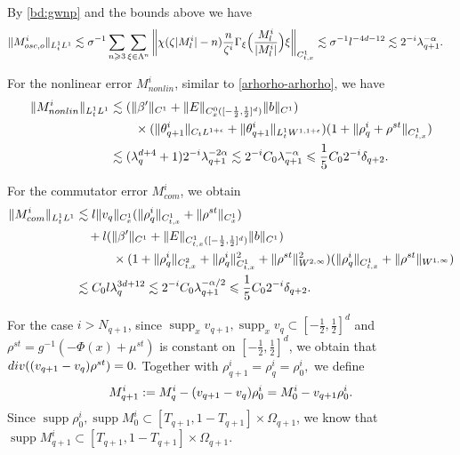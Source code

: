 \documentclass[10pt,a4paper]{amsart}
\numberwithin{equation}{section}
\DeclareMathOperator{\supp}{supp}
\def\({{\Big(}}
\def\){{\Big)}}
\newcommand{\norm}[1]{\left\|#1\right\|}
\def\geq{\geqslant}
\def\leq{\leqslant}
\def\div{\mathord{{\rm div}}}
\def\({{\Big(}}
\def\){{\Big)}}
\def\geq{\geqslant}
\def\leq{\leqslant}
\def\div{\mathord{{\rm div}}}
\begin{document}
 
 

 By \eqref{bd:gwnp} and the bounds above    we have
\begin{align}
   \|  M^{i}_{osc,o}\|_{L^1_tL^1}&\lesssim \sigma^{-1}\sum_{n\geq3}\sum_{\xi\in\Lambda^{n}}\norm{  \chi(\zeta|M_l^i|-n)\frac{n}{\zeta^i}\Gamma_{\xi}\(\frac{M^{i}_l}{|M^{i}_l|}\)\xi}_{C_{t,x}^1} \lesssim  \sigma^{-1}l^{-4d-12}
   \lesssim 2^{-i}\lambda_{q+1}^{-\alpha}.\notag
\end{align} 
 
For the nonlinear error $M_{nonlin}^i$,  similar to \eqref{arhorho-arhorho}, we have
\begin{align}
    \|M^{i}_{nonlin}\|_{L^1_tL^1} 
      &\lesssim (\|\beta' \|_{C^1 }+\|E \|_{C_{x}^0([-\frac12,\frac12]^d)}\|b\|_{C^1})\notag\\
       &\quad\quad\times ( \|\theta^{i}_{q+1}\|_{C_tL^{1+\epsilon}}+ \|\theta^{i}_{q+1}\|_{L^1_tW^{1,1+\epsilon}})  (1+\|\rho^{i}_{q}+\rho^{st}\|_{C_{t,x}^1})  \notag\\
      &\lesssim( \lambda_{q}^{d+4}+1)2^{-i}\lambda_{q+1}^{-2\alpha}\lesssim  2^{-i} C_0 \lambda_{q+1}^{-\alpha}\leq \frac{1}{5}C_02^{-i}\delta_{q+2}.\notag
\end{align} 


For the commutator error $M^i_{com} $,  we obtain
 \begin{align}
  \|M^i_{ com} \|_{L_t^1L^1}  & \lesssim l\|v_q\|_{C_{x}^1}(\|\rho_q^i\|_{C_{t,x}^1}+\|\rho^{st}\|_{C_{x}^1})\notag\\
  &\quad+l (\|\beta' \|_{C^1}+\|E \|_{C_{t,x}^1([-\frac12,\frac12]^d)}\|b\|_{C^1})\notag\\
  &\quad\quad\quad\times (1+  \| \rho_q^i \|_{C_{t,x}^2}+\| \rho_q^i\|_{C_{t,x}^1}^2+\|\rho^{st}\|_{W^{2,\infty}}^2)(\| \rho_q^i \|_{C_{t,x}^1}+\|\rho^{st}\|_{W^{1,\infty}})\notag\\
 &\lesssim  C_0 l\lambda_q^{3d+12}\lesssim  2^{-i}C_0  \lambda_{q+1}^{-\alpha/2}\leq \frac{1}{5}C_02^{-i}\delta_{q+2}.\notag 
   \end{align}    

   
For the case $i>N_{q+1}$, since $\supp_x v_{q+1},\supp_x v_q\subset [-\frac12,\frac12]^d$ and $\rho^{st}=g^{-1}(-\Phi(x)+\mu^{st})$ is constant on $[-\frac12,\frac12]^d$, we obtain that
$
\div((v_{q+1}-v_q) \rho^{st})=0.$ Together with $\rho_{q+1}^i=\rho_q^i=\rho_0^i,
$
we   define
\begin{align}
M_{q+1}^i
:=
M_q^i-(v_{q+1}-v_q)\rho_0^i
=
M_0^i-v_{q+1}\rho_0^i.
\notag
\end{align}
Since $\supp \rho^i_0,\supp M_0^i\subset[T_{q+1},1-T_{q+1}]\times\Omega_{q+1}$, we know that $\supp M_{q+1}^i\subset[T_{q+1},1-T_{q+1}]\times\Omega_{q+1}$.
\end{document}
